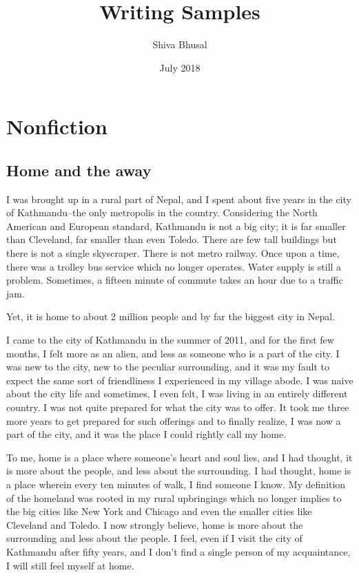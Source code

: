 \documentclass[oneside,12pt]{book}
\begin{document}
\title{Writing Samples} 
\date{July 2018}
\author{Shiva Bhusal}
\maketitle

\doublespacing
\chapter*{Nonfiction}
\section*{Home and the away}
I was brought up in a rural part of Nepal, and I spent about five years in the city of Kathmandu--the only metropolis in the country. Considering the North American and European standard, Kathmandu is not a big city; it is far smaller than Cleveland, far smaller than even Toledo. There are few tall buildings but there is not a single skyscraper. There is not metro railway. Once upon a time, there was a trolley bus service which no longer operates. Water supply is still a problem. Sometimes, a fifteen minute of commute takes an hour due to a traffic jam.

Yet, it is home to about 2 million people and by far the biggest city in Nepal.

I came to the city of Kathmandu in the summer of 2011, and for the first few months, I felt more as an alien, and less as someone who is a part of the city. I was new to the city, new to the peculiar surrounding, and it was my fault to expect the same sort of friendliness I experienced in my village abode. I was naive about the city life and sometimes, I even felt, I was living in an entirely different country. I was not quite prepared for what the city was to offer. It took me three more years to get prepared for such offerings and to finally realize, I was now a part of the city, and it was the place I could rightly call my home. 

To me, home is a place where someone’s heart and soul lies, and I had thought, it is more about the people, and less about the surrounding. I had thought, home is a place wherein every ten minutes of walk, I find someone I know. My definition of the homeland was rooted in my rural upbringings which no longer implies to the big cities like New York and Chicago and even the smaller cities like Cleveland and Toledo. I now strongly believe, home is more about the surrounding and less about the people. I feel, even if I visit the city of Kathmandu after fifty years, and I don’t find a single person of my acquaintance, I will still feel myself at home.
\end{document}
